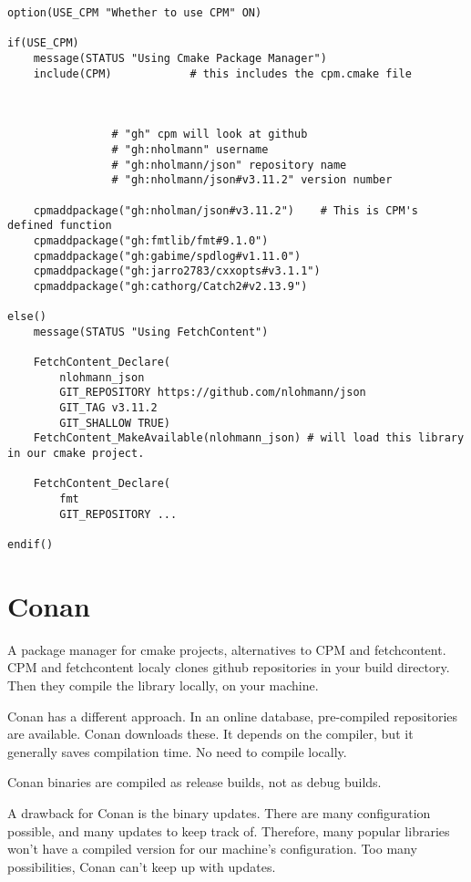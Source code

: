 \begin{verbatim}
option(USE_CPM "Whether to use CPM" ON)

if(USE_CPM)
    message(STATUS "Using Cmake Package Manager")
    include(CPM)            # this includes the cpm.cmake file
    


                # "gh" cpm will look at github
                # "gh:nholmann" username
                # "gh:nholmann/json" repository name
                # "gh:nholmann/json#v3.11.2" version number 

    cpmaddpackage("gh:nholman/json#v3.11.2")    # This is CPM's defined function
    cpmaddpackage("gh:fmtlib/fmt#9.1.0")
    cpmaddpackage("gh:gabime/spdlog#v1.11.0")
    cpmaddpackage("gh:jarro2783/cxxopts#v3.1.1")
    cpmaddpackage("gh:cathorg/Catch2#v2.13.9")

else()
    message(STATUS "Using FetchContent")

    FetchContent_Declare(
        nlohmann_json      
        GIT_REPOSITORY https://github.com/nlohmann/json
        GIT_TAG v3.11.2    
        GIT_SHALLOW TRUE)  
    FetchContent_MakeAvailable(nlohmann_json) # will load this library in our cmake project.

    FetchContent_Declare(
        fmt
        GIT_REPOSITORY ...

endif()
\end{verbatim}

\section{Conan}

A package manager for cmake projects, alternatives to CPM and fetchcontent. CPM and fetchcontent localy
clones github repositories in your build directory. Then they compile the library locally, on your machine. 


Conan has a different approach. In an online database, pre-compiled repositories are available.
Conan downloads these. It depends on the compiler, but it generally saves compilation time.
No need to compile locally.

Conan binaries are compiled as release builds, not as debug builds.

A drawback for Conan is the binary updates. There are many configuration possible, and many updates
to keep track of. Therefore, many popular libraries won't have a compiled version for our machine's
configuration. Too many possibilities, Conan can't keep up with updates.

